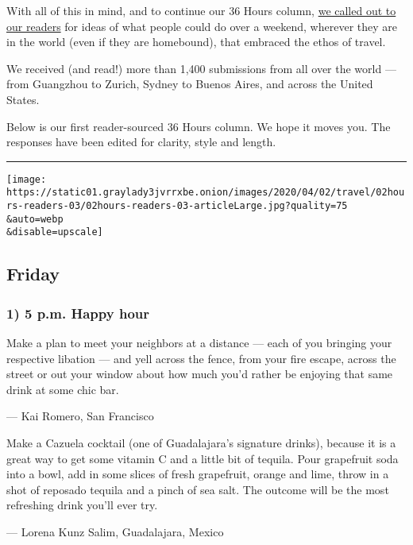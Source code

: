 With all of this in mind, and to continue our 36 Hours column,
\href{https://www.nytimes3xbfgragh.onion/2020/03/19/travel/36-hours-readers.html}{we
called out to our readers} for ideas of what people could do over a
weekend, wherever they are in the world (even if they are homebound),
that embraced the ethos of travel.

We received (and read!) more than 1,400 submissions from all over the
world --- from Guangzhou to Zurich, Sydney to Buenos Aires, and across
the United States.

Below is our first reader-sourced 36 Hours column. We hope it moves you.
The responses have been edited for clarity, style and length.

\begin{center}\rule{0.5\linewidth}{\linethickness}\end{center}

\texttt{[image: https://static01.graylady3jvrrxbe.onion/images/2020/04/02/travel/02hours-readers-03/02hours-readers-03-articleLarge.jpg?quality=75\\\&auto=webp\\\&disable=upscale]}

\hypertarget{friday}{%
\subsection{Friday}\label{friday}}

\hypertarget{1-5-pm-happy-hour}{%
\subsubsection{\texorpdfstring{\textbf{1) 5 p.m. Happy
hour}}{1) 5 p.m. Happy hour}}\label{1-5-pm-happy-hour}}

Make a plan to meet your neighbors at a distance --- each of you
bringing your respective libation --- and yell across the fence, from
your fire escape, across the street or out your window about how much
you'd rather be enjoying that same drink at some chic bar.

--- Kai Romero, San Francisco

Make a Cazuela cocktail (one of Guadalajara's signature drinks), because
it is a great way to get some vitamin C and a little bit of tequila.
Pour grapefruit soda into a bowl, add in some slices of fresh
grapefruit, orange and lime, throw in a shot of reposado tequila and a
pinch of sea salt. The outcome will be the most refreshing drink you'll
ever try.

--- Lorena Kunz Salim, Guadalajara, Mexico

